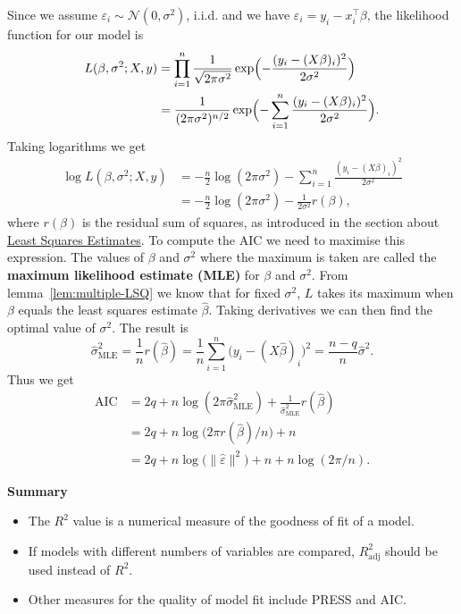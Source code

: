 \documentclass[
  a4paper,
]{article}
\providecommand{\tightlist}{%
  \setlength{\itemsep}{0pt}\setlength{\parskip}{0pt}}
\theoremstyle{definition}
\theoremstyle{definition}
\theoremstyle{definition}
\theoremstyle{definition}
\theoremstyle{remark}
\begin{document}
Since we assume \(\varepsilon_i \sim \mathcal{N}(0, \sigma^2)\), i.i.d. and
we have \(\varepsilon_i = y_i - x_i^\top\beta\), the likelihood function
for our model is
\begin{align*}
   L(\beta, \sigma^2; X, y)
   &= \prod_{i=1}^n \frac{1}{\sqrt{2\pi\sigma^2}} \exp\Bigl( - \frac{(y_i - (X\beta)_i)^2}{2\sigma^2} \Bigr) \\
   &= \frac{1}{(2\pi\sigma^2)^{n/2}} \exp\Bigl( - \sum_{i=1}^n \frac{(y_i - (X\beta)_i)^2}{2\sigma^2} \Bigr).
\end{align*}
Taking logarithms we get
\begin{align*}
   \log L(\beta, \sigma^2; X, y)
   &= -\frac{n}{2} \log(2\pi\sigma^2) - \sum_{i=1}^n \frac{(y_i - (X\beta)_i)^2}{2\sigma^2} \\
   &= -\frac{n}{2} \log(2\pi\sigma^2) - \frac{1}{2\sigma^2} r(\beta),
\end{align*}
where \(r(\beta)\) is the residual sum of squares, as introduced
in the section about \hyperref[S02-multiple]{Least Squares Estimates}. To compute the AIC
we need to maximise this expression. The values of \(\beta\) and \(\sigma^2\)
where the maximum is taken are called the \textbf{maximum likelihood estimate (MLE)}
for \(\beta\) and \(\sigma^2\). From lemma~\ref{lem:multiple-LSQ} we know
that for fixed \(\sigma^2\), \(L\) takes its maximum when \(\beta\) equals the
least squares estimate \(\hat\beta\). Taking derivatives we can then
find the optimal value of \(\sigma^2\). The result is
\begin{equation*}
   \hat\sigma^2_\mathrm{MLE}
   = \frac1n r(\hat\beta)
   = \frac{1}{n} \sum_{i=1}^n \bigl( y_i - (X \hat\beta)_i \bigr)^2
   = \frac{n-q}{n} \hat\sigma^2.
\end{equation*}
Thus we get
\begin{align*}
   \mathrm{AIC}
   &= 2q + n \log(2\pi\hat\sigma^2_\mathrm{MLE}) + \frac{1}{\hat\sigma^2_\mathrm{MLE}} r(\hat\beta) \\
   &= 2q + n \log\bigl( 2\pi r(\hat\beta) / n \bigr) + n \\
   &= 2q + n \log\bigl( \|\hat\varepsilon\|^2 \bigr) + n + n \log( 2\pi / n ).
\end{align*}

\textbf{Summary}

\begin{itemize}
\tightlist
\item
  The \(R^2\) value is a numerical measure of the goodness of fit of a model.
\item
  If models with different numbers of variables are compared,
  \(R^2_\mathrm{adj}\) should be used instead of \(R^2\).
\item
  Other measures for the quality of model fit include PRESS and AIC.
\end{itemize}
\end{document}
